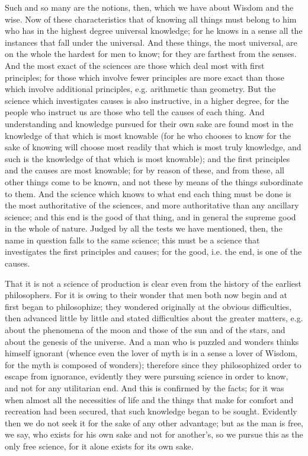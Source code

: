 \documentclass[oneside, 17pt, dvipsnames]{extbook}
\begin{document}
Such and so many are the notions, then, which we have about Wisdom and the wise. Now of these characteristics that of knowing all things must belong to him who has in the highest degree universal knowledge; for he knows in a sense all the instances that fall under the universal. And these things, the most universal, are on the whole the hardest for men to know; for they are farthest from the senses. And the most exact of the sciences are those which deal most with first principles; for those which involve fewer principles are more exact than those which involve additional principles, e.g. arithmetic than geometry. But the science which investigates causes is also instructive, in a higher degree, for the people who instruct us are those who tell the causes of each thing. And understanding and knowledge pursued for their own sake are found most in the knowledge of that which is most knowable (for he who chooses to know for the sake of knowing will choose most readily that which is most truly knowledge, and such is the knowledge of that which is most knowable); and the first principles and the causes are most knowable; for by reason of these, and from these, all other things come to be known, and not these by means of the things subordinate to them. And the science which knows to what end each thing must be done is the most authoritative of the sciences, and more authoritative than any ancillary science; and this end is the good of that thing, and in general the supreme good in the whole of nature. Judged by all the tests we have mentioned, then, the name in question falls to the same science; this must be a science that investigates the first principles and causes; for the good, i.e. the end, is one of the causes.

That it is not a science of production is clear even from the history of the earliest philosophers. For it is owing to their wonder that men both now begin and at first began to philosophize; they wondered originally at the obvious difficulties, then advanced little by little and stated difficulties about the greater matters, e.g. about the phenomena of the moon and those of the sun and of the stars, and about the genesis of the universe. And a man who is puzzled and wonders thinks himself ignorant (whence even the lover of myth is in a sense a lover of Wisdom, for the myth is composed of wonders); therefore since they philosophized order to escape from ignorance, evidently they were pursuing science in order to know, and not for any utilitarian end. And this is confirmed by the facts; for it was when almost all the necessities of life and the things that make for comfort and recreation had been secured, that such knowledge began to be sought. Evidently then we do not seek it for the sake of any other advantage; but as the man is free, we say, who exists for his own sake and not for another's, so we pursue this as the only free science, for it alone exists for its own sake.
\end{document}
